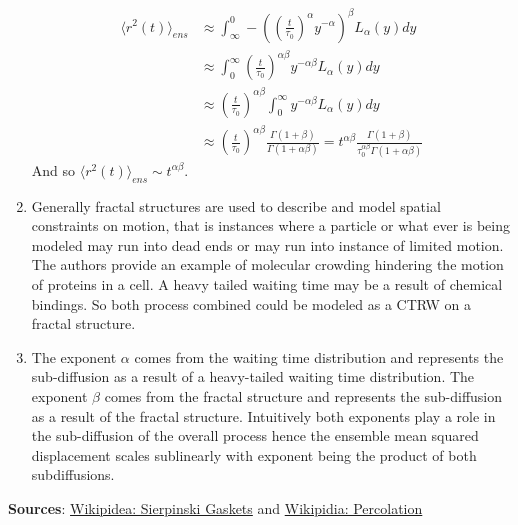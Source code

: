 \documentclass[12pt]{amsart}
\theoremstyle{definition}
\newcommand{\ip}[1]{\langle#1\rangle}
\begin{document}
\begin{enumerate}
\begin{align*}
    \ip{r^2(t)}_{ens}&\approx\int_{\infty}^0 -\left(\left(\frac{t}{\tau_0}\right)^\alpha y^{-\alpha}\right)^\beta L_\alpha\left(y\right)dy\\
    &\approx\int_{0}^\infty \left(\frac{t}{\tau_0}\right)^{\alpha\beta} y^{-\alpha\beta} L_\alpha\left(y\right)dy\\
    &\approx\left(\frac{t}{\tau_0}\right)^{\alpha\beta}\int_{0}^\infty y^{-\alpha\beta} L_\alpha\left(y\right)dy\\
    &\approx\left(\frac{t}{\tau_0}\right)^{\alpha\beta}\frac{\Gamma(1+\beta)}{\Gamma(1+\alpha\beta)}= t^{\alpha\beta}\frac{\Gamma(1+\beta)}{\tau_0^{\alpha\beta}\Gamma(1+\alpha\beta)}
\end{align*}
And so $\ip{r^2(t)}_{ens} \sim t^{\alpha\beta}$.\\


\item Generally fractal structures are used to describe and model spatial constraints on motion, that is instances where a particle or what ever is being modeled may run into dead ends or may run into instance of limited motion. The authors provide an example of molecular crowding hindering the motion of proteins in a cell. A heavy tailed waiting time may be a result of chemical bindings. So both process combined could be modeled as a CTRW on a fractal structure.\\

\item The exponent $\alpha$ comes from the waiting time distribution and represents the sub-diffusion as a result of a heavy-tailed waiting time distribution. The exponent $\beta$ comes from the fractal structure and represents the sub-diffusion as a result of the fractal structure. Intuitively both exponents play a role in the sub-diffusion of the overall process hence the ensemble mean squared displacement scales sublinearly with exponent being the product of both subdiffusions.
\end{enumerate}

\textbf{Sources}: \href{https://en.wikipedia.org/wiki/Sierpinski_triangle}{Wikipidea: Sierpinski Gaskets} and \href{https://en.wikipedia.org/wiki/Percolation_theory#Criticality}{Wikipidia: Percolation}
\end{document}
